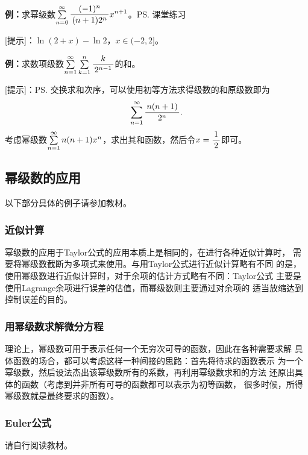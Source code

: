 {\bf 例：}求幂级数$\sumn[0]\df{(-1)^n}{(n+1)2^n}x^{n+1}$。\ps{课堂练习}

[提示]：$\ln(2+x)-\ln2$，$x\in(-2,2]$。

{\bf 例：}求数项级数$\sumn\sum\limits_{k=1}^n\df{k}{2^{n-1}}$的和。

[提示]：\ps{交换求和次序，可以使用初等方法求得级数的和}原级数即为
$$\sumn\df{n(n+1)}{2^n}.$$
考虑幂级数$\sumn n(n+1)x^n$，求出其和函数，然后令$x=\df12$即可。

\subsection{幂级数的应用}

以下部分具体的例子请参加教材。

\subsubsection{近似计算}

幂级数的应用于Taylor公式的应用本质上是相同的，在进行各种近似计算时，
需要将幂级数截断为多项式来使用。与用Taylor公式进行近似计算略有不同
的是，使用幂级数进行近似计算时，对于余项的估计方式略有不同：Taylor公式
主要是使用Lagrange余项进行误差的估值，而幂级数则主要通过对余项的
适当放缩达到控制误差的目的。

\subsubsection{用幂级数求解微分方程}

理论上，幂级数可用于表示任何一个无穷次可导的函数，因此在各种需要求解
具体函数的场合，都可以考虑这样一种间接的思路：首先将待求的函数表示
为一个幂级数，然后设法杰出该幂级数所有的系数，再利用幂级数求和的方法
还原出具体的函数（考虑到并非所有可导的函数都可以表示为初等函数，
很多时候，所得幂级数就是最终要求的函数）。

\subsubsection{Euler公式}

请自行阅读教材。

\bs

